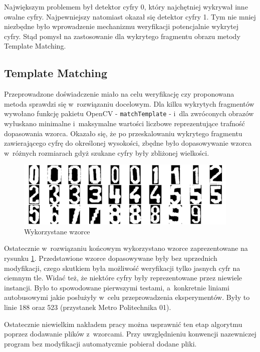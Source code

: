Największym problemem był detektor cyfry 0, który najchętniej
wykrywał inne owalne cyfry. Najpewniejszy natomiast okazał się
detektor cyfry 1. Tym nie mniej niezbędne było wprowadzenie
mechanizmu weryfikacji potencjalnie wykrytej cyfry. Stąd 
pomysł na zastosowanie dla wykrytego fragmentu obrazu metody
Template Matching.

\subsection{Template Matching}

Przeprowadzone doświadczenie miało na celu weryfikację czy
proponowana metoda sprawdzi się w~rozwiązaniu docelowym. Dla
kilku wykrytych fragmentów wywołano funkcję pakietu OpenCV 
- \verb|matchTemplate| - i~dla zwróconych obrazów wyłuskano
minimalne i~maksymalne wartości liczbowe reprezentujące trafność
dopasowania wzorca. Okazało się, że po przeskalowaniu wykrytego
fragmentu zawierającego cyfrę do określonej wysokości, zbędne
było dopasowywanie wzorca w~różnych rozmiarach gdyż szukane cyfry
były zbliżonej wielkości. 

\begin{figure}[h!]
    \centering
    \includegraphics[width=0.95\textwidth]{img/exp_templates_used}
    \caption{Wykorzystane wzorce}
    \label{fig:used_templates}
\end{figure}

Ostatecznie w~rozwiązaniu końcowym wykorzystano wzorce zaprezentowane
na rysunku \ref{fig:used_templates}.
Przedstawione wzorce dopasowywane były bez uprzednich modyfikacji,
czego skutkiem była możliwość weryfikacji tylko jasnych cyfr
na ciemnym tle. Widać też, że niektóre cyfry były reprezentowane
przez niewiele instancji. Było to spowodowane pierwszymi testami,
a~konkretnie liniami autobusowymi jakie posłużyły w~celu
przeprowadzenia eksperymentów. Były to linie 188 oraz 523 (przystanek
Metro Politechnika 01). 

Ostatecznie niewielkim nakładem pracy można usprawnić ten etap
algorytmu poprzez dodawanie plików z~wzorcami. Przy uwzględnieniu 
konwencji nazewniczej program bez modyfikacji automatycznie
pobierał dodane pliki.

